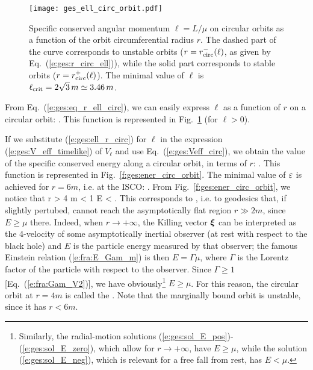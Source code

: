 \begin{figure}
\centerline{\texttt{[image: ges\_ell\_circ\_orbit.pdf]}}
\caption[]{\label{f:ges:ell_circ_orbit} \footnotesize
Specific conserved angular momentum $\ell = L/\mu$
on circular orbits as a function of the
orbit circumferential radius $r$. The dashed part of the curve
corresponds to unstable orbits ($r=r_{\rm circ}^-(\ell)$, as given by Eq.~(\ref{e:ges:r_circ_ell})), while
the solid part corresponds to stable orbits ($r=r_{\rm circ}^+(\ell)$).
The minimal value of $\ell$ is $\ell_{\rm crit} = 2\sqrt{3}\, m \simeq 3.46\, m$.}
\end{figure}

From Eq.~(\ref{e:ges:eq_r_ell_circ}), we can easily express $\ell$
as a function of $r$ on a circular orbit:
\be \label{e:ges:ell_r_circ}
     .
\ee
This function is represented in Fig.~\ref{f:ges:ell_circ_orbit} (for $\ell > 0$).

If we substitute (\ref{e:ges:ell_r_circ}) for $\ell$ in
the expression (\ref{e:ges:V_eff_timelike}) of $V_{\ell}$
and use Eq.~(\ref{e:ges:Veff_circ}), we obtain the value of the
specific conserved energy along a circular orbit, in terms of $r$:
\be \label{e:ges:eps_r_circ}
     .
\ee
This function is represented in Fig.~\ref{f:ges:ener_circ_orbit}.
The minimal value of $\varepsilon$ is achieved for $r=6m$, i.e. at the ISCO:
\be
     .
\ee
From Fig.~\ref{f:ges:ener_circ_orbit}, we notice that
\be \label{e:ges:r_marginally_bound}
    r > 4 m \iff \veps < 1 \iff E < \mu .
\ee
This corresponds to ,
i.e. to geodesics that, if slightly pertubed, cannot reach the asymptotically
flat region $r\gg 2m$, since $E \geq \mu$ there. Indeed, when
$r\to +\infty$, the Killing vector $\bm{\xi}$ can be interpreted
as the 4-velocity of some asymptotically inertial observer (at rest with
respect to the black hole) and $E$ is the particle energy measured by
that observer; the famous Einstein relation (\ref{e:fra:E_Gam_m}) is then
$E = \Gamma \mu$, where $\Gamma$ is the Lorentz factor
of the particle with respect to the observer.
Since $\Gamma \geq 1$ [Eq.~(\ref{e:fra:Gam_V2})], we have obviously\footnote{Similarly,
the radial-motion solutions (\ref{e:ges:sol_E_pos})-(\ref{e:ges:sol_E_zero}), which
allow for $r\to +\infty$, have $E \geq\mu$, while the solution (\ref{e:ges:sol_E_neg}),
which is relevant for a free fall from rest, has $E < \mu$.} $E \geq \mu$.
For this reason, the circular orbit at $r=4m$ is called the
. Note that the marginally bound orbit is unstable, since it has $r<6m$.

